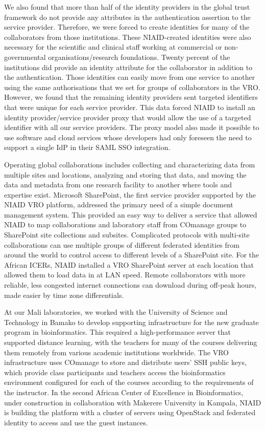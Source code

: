 \documentclass[fleqn,10pt]{wlscirep}
\begin{document}
{We also found that more than half of the identity providers in the global trust framework do not provide any attributes in the authentication assertion to the service provider.  Therefore, we were forced to create identities for many of the collaborators from those institutions.  These NIAID-created identities were also necessary for the scientific and clinical staff working at commercial or non-governmental organisations/research foundations.  Twenty percent of the institutions did provide an identity attribute for the collaborator in addition to the authentication.  Those identities can easily move from one service to another using the same authorisations that we set for groups of collaborators in the VRO.  However, we found that the remaining identity providers sent targeted identifiers that were unique for each service provider.  This data forced NIAID to install an identity provider/service provider proxy that would allow the use of a targeted identifier with all our service providers.  The proxy model also made it possible to use software and cloud services whose developers had only foreseen the need to support a single IdP in their SAML SSO integration.

Operating global collaborations includes collecting and characterizing data from multiple sites and locations, analyzing and storing that data, and moving the data and metadata from one research facility to another where tools and expertise exist.  Microsoft SharePoint, the first service provider supported by the NIAID VRO platform, addressed the primary need of a simple document management system.  This provided an easy way to deliver a service that allowed NIAID to map collaborations and laboratory staff from COmanage groups to SharePoint site collections and subsites.  Complicated protocols with multi-site collaborations can use multiple groups of different federated identities from around the world to control access to different levels of a SharePoint site.  For the African ICERs, NIAID installed a VRO SharePoint server at each location that allowed them to load data in at LAN speed.  Remote collaborators with more reliable, less congested internet connections can download during off-peak hours, made easier by time zone differentials.

At our Mali laboratories, we worked with the University of Science and Technology in Bamako to develop supporting infrastructure for the new graduate program in bioinformatics.  This required a high-performance server that supported distance learning, with the teachers for many of the courses delivering them remotely from various academic institutions worldwide.  The VRO infrastructure uses COmanage to store and distribute users' SSH public keys, which provide class participants and teachers access the bioinformatics environment configured for each of the courses according to the requirements of the instructor.  In the second African Center of Excellence in Bioinformatics, under construction in collaboration with Makerere University in Kampala, NIAID is building the platform with a cluster of servers using OpenStack and federated identity to access and use the guest instances.

}
\end{document}
